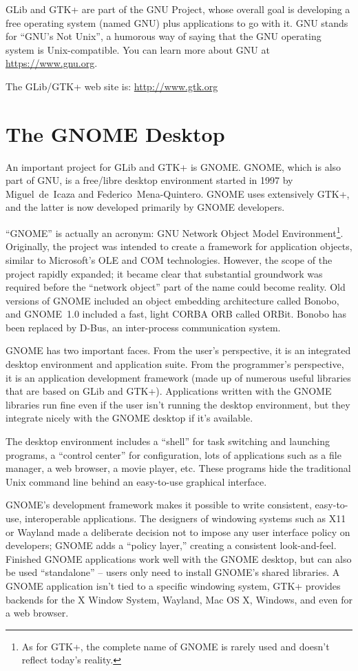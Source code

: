GLib and GTK+ are part of the GNU Project, whose overall goal is developing a free operating system (named GNU) plus applications to go with it. GNU stands for ``GNU's Not Unix'', a humorous way of saying that the GNU operating system is Unix-compatible. You can learn more about GNU at \url{https://www.gnu.org}.

The GLib/GTK+ web site is: \url{http://www.gtk.org}

\section{The GNOME Desktop}

An important project for GLib and GTK+ is GNOME. GNOME, which is also part of GNU, is a free/libre desktop environment started in 1997 by Miguel~de~Icaza and Federico~Mena-Quintero. GNOME uses extensively GTK+, and the latter is now developed primarily by GNOME developers.

``GNOME'' is actually an acronym: GNU Network Object Model Environment\footnote{As for GTK+, the complete name of GNOME is rarely used and doesn't reflect today's reality.}. Originally, the project was intended to create a framework for application objects, similar to Microsoft's OLE and COM technologies. However, the scope of the project rapidly expanded; it became clear that substantial groundwork was required before the ``network object'' part of the name could become reality. Old versions of GNOME included an object embedding architecture called Bonobo, and GNOME~1.0 included a fast, light CORBA ORB called ORBit. Bonobo has been replaced by D-Bus, an inter-process communication system.

GNOME has two important faces. From the user's perspective, it is an integrated desktop environment and application suite. From the programmer's perspective, it is an application development framework (made up of numerous useful libraries that are based on GLib and GTK+). Applications written with the GNOME libraries run fine even if the user isn't running the desktop environment, but they integrate nicely with the GNOME desktop if it's available.

The desktop environment includes a ``shell'' for task switching and launching programs, a ``control center'' for configuration, lots of applications such as a file manager, a web browser, a movie player, etc. These programs hide the traditional Unix command line behind an easy-to-use graphical interface.

GNOME's development framework makes it possible to write consistent, easy-to-use, interoperable applications. The designers of windowing systems such as X11 or Wayland made a deliberate decision not to impose any user interface policy on developers; GNOME adds a ``policy layer,'' creating a consistent look-and-feel. Finished GNOME applications work well with the GNOME desktop, but can also be used ``standalone'' -- users only need to install GNOME's shared libraries. A GNOME application isn't tied to a specific windowing system, GTK+ provides backends for the X Window System, Wayland, Mac OS X, Windows, and even for a web browser.

